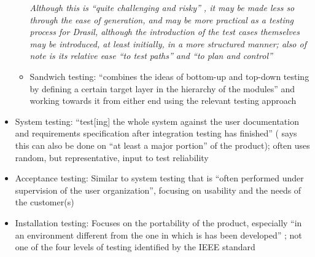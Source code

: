 \begin{itemize}
\begin{itemize}
                        \emph{Although this is ``quite challenging and risky''
                              \citep[p.~489]{PetersAndPedrycz2000}, it may be
                              made less so through the ease of generation,
                              and may be more practical as a testing process
                              for Drasil, although the introduction of the
                              test cases themselves may be introduced, at least
                              initially, in a more structured manner; also of
                              note is its relative ease ``to test paths'' and
                              ``to plan and control''
                              \citep[p.~490]{PetersAndPedrycz2000}
                              }
                  \item Sandwich testing: ``combines the ideas of bottom-up and
                        top-down testing by defining a certain target layer in
                        the hierarchy of the modules'' and working towards it
                        from either end using the relevant testing approach
                        \citep[p.~491]{PetersAndPedrycz2000}
            \end{itemize}
      \item System testing: ``test[ing] the whole system against the user
            documentation and requirements specification after integration
            testing has finished'' \citep[p.~439]{vanVliet2000}
            (\citep[p.~109]{Patton2006} says this can also be done on
            ``at least a major portion'' of the product); often uses random,
            but representative, input to test reliability
            \citep[p.~439]{vanVliet2000}
      \item Acceptance testing: Similar to system testing that is ``often
            performed under supervision of the user organization'',
            focusing on usability \citep[p.~439]{vanVliet2000} and
            the needs of the customer(s) \citep[p.~492]{PetersAndPedrycz2000}
      \item Installation testing: Focuses on the portability of the product,
            especially ``in an environment different from the one in which is
            has been developed'' \citep[p.~439]{vanVliet2000}; not
            one of the four levels of testing identified by the IEEE standard
            \citep[p.~445]{PetersAndPedrycz2000}
\end{itemize}

